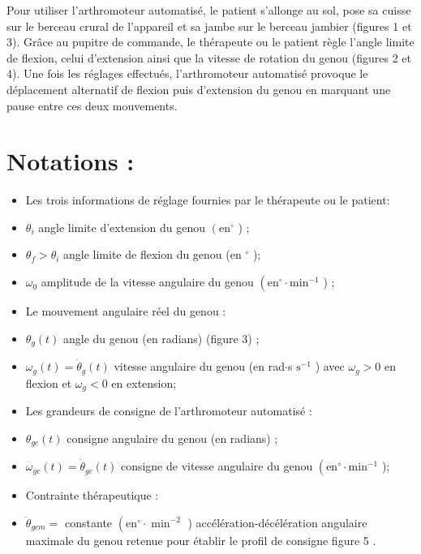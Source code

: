\documentclass[10pt]{article}
\begin{document}
Pour utiliser l'arthromoteur automatisé, le patient s'allonge au sol, pose sa cuisse sur le berceau crural de l'appareil et sa jambe sur le berceau jambier (figures 1 et 3). Grâce au pupitre de commande, le thérapeute ou le patient règle l'angle limite de flexion, celui d'extension ainsi que la vitesse de rotation du genou (figures 2 et 4). Une fois les réglages effectués, l'arthromoteur automatisé provoque le déplacement alternatif de flexion puis d'extension du genou en marquant une pause entre ces deux mouvements.

\section*{Notations :}
\begin{itemize}
  \item Les trois informations de réglage fournies par le thérapeute ou le patient:

  \item $\theta_{i}$ angle limite d'extension du genou $\left(\mathrm{en}^{\circ}\right.$ ) ;

  \item $\theta_{f}>\theta_{i}$ angle limite de flexion du genou (en ${ }^{\circ}$ );

  \item $\omega_{0}$ amplitude de la vitesse angulaire du genou $\left(\mathrm{en}^{\circ} \cdot \mathrm{min}^{-1}\right.$ ) ;

  \item Le mouvement angulaire réel du genou :

  \item $\theta_{g}(t)$ angle du genou (en radians) (figure 3) ;

  \item $\omega_{g}(t)=\dot{\theta}_{g}(t)$ vitesse angulaire du genou (en rad$\cdot$s $\mathrm{s}^{-1}$ ) avec $\omega_{g}>0$ en flexion et $\omega_{g}<0$ en extension;

  \item Les grandeurs de consigne de l'arthromoteur automatisé :

  \item $\theta_{g c}(t)$ consigne angulaire du genou (en radians) ;

  \item $\omega_{g c}(t)=\dot{\theta}_{g c}(t)$ consigne de vitesse angulaire du genou $\left(\mathrm{en}^{\circ} \cdot \mathrm{min}^{-1}\right.$ );

  \item Contrainte thérapeutique :

  \item $\ddot{\theta}_{g c m}=$ constante $\left(\mathrm{en}^{\circ} \cdot \min ^{-2}\right.$ ) accélération-décélération angulaire maximale du genou retenue pour établir le profil de consigne figure 5 .

\end{itemize}
\end{document}

